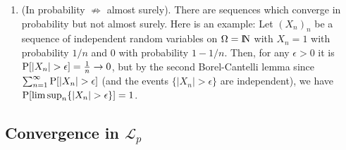 \documentclass[a4paper,10pt]{article}
\begin{document}
\begin{enumerate}
 \item (In probability $\not\Rightarrow$ almost surely). 
       There are sequences which converge in probability but not almost surely. Here is an example:
              Let $(X_n)_n$ be a sequence of independent random variables on $\Omega=\N$
              with $X_n=1$ with probability $1/n$ and $0$ with probability $1-1/n$.
              Then, for any $\epsilon>0$ it is $\prob[|X_n|>\epsilon]=\tfrac{1}{n}\to 0$,
              but by the second Borel-Cantelli lemma since $\sum_{n=1}^{\infty}\prob[|X_n|>\epsilon]$
              (and the events $\{|X_n|>\epsilon\}$ are independent), we have $\prob[\limsup_n \{|X_n|>\epsilon\}]=1$.
       
\end{enumerate} 
 
\subsection{Convergence in $\mathcal{L}_p$}
\end{document}
